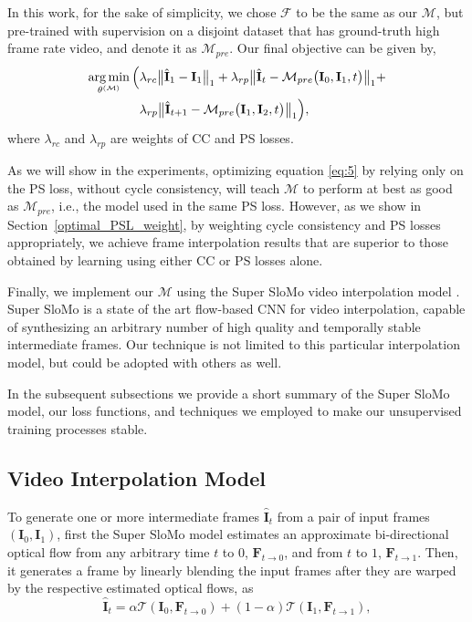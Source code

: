 \documentclass[10pt,twocolumn,letterpaper]{article}
\begin{document}
In this work, for the sake of simplicity, we chose $\mathcal{F}$ to be the same as our $\mathcal{M}$, but pre-trained with supervision on a disjoint dataset that has ground-truth high frame rate video, and denote it as $\mathcal{M}_{pre}$. Our final objective can be given by,
\begin{equation} 
\label{eq:5}
\begin{split}
\operatorname*{arg\,min}_{ \bold{\theta}^ { (\mathcal{M}) }  }   \Big(
&\lambda_{rc}\big\lVert \hat{\textbf{I}}_{1} - \textbf{I}_{1} \big\rVert_1  + \lambda_{rp}\big\lVert \hat{\textbf{I}}_{t} - \mathcal{M}_{pre}\big(\textbf{I}_{0},\textbf{I}_{1},t\big) \big\rVert_1 + \\
&\lambda_{rp}\big\lVert \hat{\textbf{I}}_{t+1} - \mathcal{M}_{pre}\big(\textbf{I}_{1},\textbf{I}_{2},t\big) 
\big\rVert_1
\Big), 
\end{split}
\end{equation}
\noindent where $\lambda_{rc}$ and $\lambda_{rp}$ are weights of CC and PS losses.

As we will show in the experiments, optimizing equation \ref{eq:5} by relying only on the PS loss, without cycle consistency, will teach $\mathcal{M}$ to perform at best as good as $\mathcal{M}_{pre}$, i.e., the model used in the same PS loss. However, as we show in Section~\ref{optimal_PSL_weight}, by weighting cycle consistency and PS losses appropriately, we achieve frame interpolation results that are superior to those obtained by learning using either CC or PS losses alone.

Finally, we implement our $\mathcal{M}$ using the Super SloMo video interpolation model \cite{jiang2018super}. Super SloMo is a state of the art flow-based CNN for video interpolation, capable of synthesizing an arbitrary number of high quality and temporally stable intermediate frames. Our technique is not limited to this particular interpolation model, but could be adopted with others as well.

In the subsequent subsections we provide a short summary of the Super SloMo model, our loss functions, and techniques we employed to make our unsupervised training processes stable.

\subsection{Video Interpolation Model}
To generate one or more intermediate frames $\hat{\textbf{I}}_{t}$ from a pair of input frames $(\textbf{I}_{0}, \textbf{I}_{1})$, first the Super SloMo model estimates an approximate bi-directional optical flow from any arbitrary time $t$ to $0$, $\textbf{F}_{t\rightarrow0}$, and from $t$ to $1$, $\textbf{F}_{t\rightarrow1}$. Then, it generates a frame by linearly blending the input frames after they are warped by the respective estimated optical flows, as
\begin{equation} \label{eq:6}
\hat{\textbf{I}}_{t} = \alpha \mathcal{T}(\textbf{I}_{0},\textbf{F}_{t\rightarrow0}) + (1-\alpha) \mathcal{T}(\textbf{I}_{1},\textbf{F}_{t\rightarrow1}) , 
\end{equation}
\end{document}
